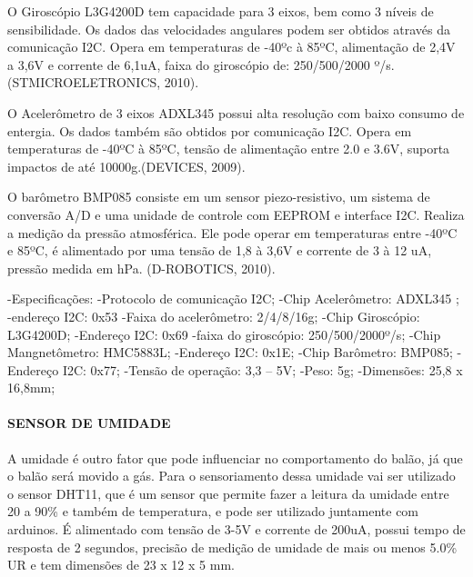     O Giroscópio L3G4200D tem capacidade para 3 eixos, bem como 3 níveis de sensibilidade. Os dados das velocidades angulares podem ser obtidos através da comunicação I2C. Opera em temperaturas de -40ºc à 85ºC, alimentação de 2,4V a 3,6V e corrente de 6,1uA,  faixa do giroscópio de: 250/500/2000 º/s.(STMICROELETRONICS, 2010).
    
    O Acelerômetro de 3 eixos ADXL345 possui alta resolução com baixo consumo de entergia. Os dados também são obtidos por comunicação I2C. Opera em temperaturas de -40ºC à 85ºC, tensão de alimentação entre 2.0 e 3.6V, suporta impactos de até 10000g.(DEVICES, 2009).
    
    O barômetro BMP085 consiste em um sensor piezo-resistivo, um sistema de conversão A/D e uma unidade de controle com EEPROM e interface I2C. Realiza a medição da pressão atmosférica. Ele pode operar em temperaturas entre -40ºC e 85ºC, é alimentado por uma tensão de 1,8 à 3,6V e corrente de 3 à 12 uA, pressão medida em hPa. (D-ROBOTICS, 2010).
    
    -Especificações:
                    	-Protocolo de comunicação I2C;
                    	-Chip Acelerômetro: ADXL345 ;
                    	-endereço I2C: 0x53
                    	-Faixa do acelerômetro: 2/4/8/16g;
                    	-Chip Giroscópio: L3G4200D;
                    	-Endereço I2C: 0x69
                    	-faixa do giroscópio: 250/500/2000º/s;
                    	-Chip Mangnetômetro: HMC5883L;
                    	-Endereço I2C: 0x1E;
                    	-Chip Barômetro: BMP085;
                    	-Endereço I2C: 0x77;
                    	-Tensão de operação: 3,3 – 5V;
                    	-Peso: 5g;
                    	-Dimensões: 25,8 x 16,8mm;

  \paragraph{SENSOR DE UMIDADE}
    A umidade é outro fator que pode influenciar no comportamento do balão, já que o balão será movido a gás. Para o sensoriamento dessa umidade vai ser utilizado o sensor DHT11, que é um sensor que permite fazer a leitura da umidade entre 20 a 90\% e também de temperatura, e pode ser utilizado juntamente com arduinos. É alimentado com tensão de 3-5V e corrente de 200uA, possui tempo de resposta de 2 segundos, precisão de medição de umidade de mais ou menos 5.0\% UR e tem dimensões de 23 x 12 x 5 mm.
  
